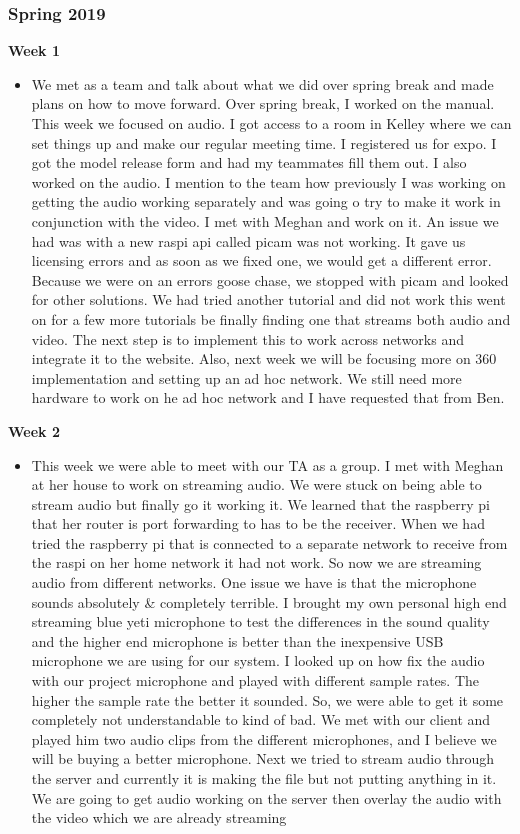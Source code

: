 \documentclass[onecolumn, draftclsnofoot,10pt, compsoc]{IEEEtran}
\begin{document}
        \subsubsection{Spring 2019}
            \textbf{Week 1}
            \begin{itemize}
                \item We met as a team and talk about what we did over spring break and made plans on how to move forward. Over spring break, I worked on the manual. This week we focused on audio. I got access to a room in Kelley where we can set things up and make our regular meeting time. I registered us for expo. I got the model release form and had my teammates fill them out. I also worked on the audio. I mention to the team how previously I was working on getting the audio working separately and was going o try to make it work in conjunction with the video. I met with Meghan and work on it. An issue we had was with a new raspi api called picam was not working. It gave us licensing errors and as soon as we fixed one, we would get a different error. Because we were on an errors goose chase, we stopped with picam and looked for other solutions. We had tried another tutorial and did not work this went on for a few more tutorials be finally finding one that streams both audio and video. The next step is to implement this to work across networks and integrate it to the website. Also, next week we will be focusing more on 360 implementation and setting up an ad hoc network. We still need more hardware to work on he ad hoc network and I have requested that from Ben.
            \end{itemize}
            \newpage
            \textbf{Week 2}
            \begin{itemize}
                \item This week we were able to meet with our TA as a group. I met with Meghan at her house to work on streaming audio. We were stuck on being able to stream audio but finally go it working it. We learned that the raspberry pi that her router is port forwarding to has to be the receiver. When we had tried the raspberry pi that is connected to a separate network to receive from the raspi on her home network it had not work. So now we are streaming audio from different networks. One issue we have is that the microphone sounds absolutely & completely terrible. I brought my own personal high end streaming blue yeti microphone to test the differences in the sound quality and the higher end microphone is better than the inexpensive USB microphone we are using for our system. I looked up on how fix the audio with our project microphone and played with different sample rates. The higher the sample rate the better it sounded. So, we were able to get it some completely not understandable to kind of bad. We met with our client and played him two audio clips from the different microphones, and I believe we will be buying a better microphone. Next we tried to stream audio through the server and currently it is making the file but not putting anything in it. We are going to get audio working on the server then overlay the audio with the video which we are already streaming
            \end{itemize}
            
\end{document}
